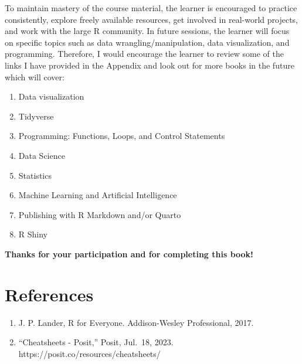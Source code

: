 \documentclass[
  letterpaper,
  DIV=11,
  numbers=noendperiod]{scrreprt}
\newlength{\cslhangindent}
\newenvironment{CSLReferences}[2] %
 {\begin{list}{}{%
  \setlength{\itemindent}{0pt}
  \setlength{\leftmargin}{0pt}
  \setlength{\parsep}{0pt}
  \ifodd #1
   \setlength{\leftmargin}{\cslhangindent}
   \setlength{\itemindent}{-1\cslhangindent}
  \fi
  \setlength{\itemsep}{#2\baselineskip}}}
 {\end{list}}
\begin{document}
To maintain mastery of the course material, the learner is encouraged to
practice consistently, explore freely available resources, get involved
in real-world projects, and work with the large R community. In future
sessions, the learner will focus on specific topics such as data
wrangling/manipulation, data visualization, and programming. Therefore,
I would encourage the learner to review some of the links I have
provided in the Appendix and look out for more books in the future which
will cover:

\begin{enumerate}
\def\labelenumi{\roman{enumi}.}
\item
  Data visualization
\item
  Tidyverse
\item
  Programming: Functions, Loops, and Control Statements
\item
  Data Science
\item
  Statistics
\item
  Machine Learning and Artificial Intelligence
\item
  Publishing with R Markdown and/or Quarto
\item
  R Shiny
\end{enumerate}

\textbf{Thanks for your participation and for completing this book!}


\chapter*{References}\label{references}


\label{refs}
\begin{CSLReferences}{0}{1}
\begin{enumerate}
\def\labelenumi{\arabic{enumi}.}
\item
  J. P. Lander, R for Everyone. Addison-Wesley Professional, 2017.
\item
  ``Cheatsheets - Posit,'' Posit, Jul.~18, 2023.
  https://posit.co/resources/cheatsheets/
\end{enumerate}

\end{CSLReferences}

\cleardoublepage
{}
{}
\appendix
\end{document}
